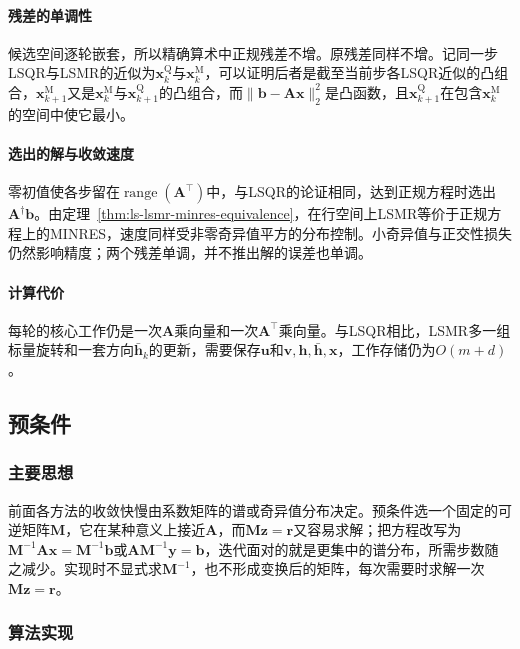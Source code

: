\paragraph{残差的单调性}
候选空间逐轮嵌套，所以精确算术中正规残差不增。原残差同样不增。记同一步LSQR与LSMR的近似为$\bm x_k^{\mathrm Q}$与$\bm x_k^{\mathrm M}$，可以证明后者是截至当前步各LSQR近似的凸组合，$\bm x_{k+1}^{\mathrm M}$又是$\bm x_k^{\mathrm M}$与$\bm x_{k+1}^{\mathrm Q}$的凸组合，而$\lVert\bm b-\bm A\bm x\rVert_2^2$是凸函数，且$\bm x_{k+1}^{\mathrm Q}$在包含$\bm x_k^{\mathrm M}$的空间中使它最小。

\paragraph{选出的解与收敛速度}
零初值使各步留在$\operatorname{range}(\bm A^\top)$中，与LSQR的论证相同，达到正规方程时选出$\bm A^\dagger\bm b$。由定理~\ref{thm:ls-lsmr-minres-equivalence}，在行空间上LSMR等价于正规方程上的MINRES，速度同样受非零奇异值平方的分布控制。小奇异值与正交性损失仍然影响精度；两个残差单调，并不推出解的误差也单调。

\paragraph{计算代价}
每轮的核心工作仍是一次$\bm A$乘向量和一次$\bm A^\top$乘向量。与LSQR相比，LSMR多一组标量旋转和一套方向$\bar{\bm h}_k$的更新，需要保存$\bm u$和$\bm v,\bm h,\bar{\bm h},\bm x$，工作存储仍为$O(m+d)$。

\subsection{预条件}
\label{sec:ls-preconditioning}

\subsubsection{主要思想}

前面各方法的收敛快慢由系数矩阵的谱或奇异值分布决定。预条件选一个固定的可逆矩阵$\bm M$，它在某种意义上接近$\bm A$，而$\bm M\bm z=\bm r$又容易求解；把方程改写为$\bm M^{-1}\bm A\bm x=\bm M^{-1}\bm b$或$\bm A\bm M^{-1}\bm y=\bm b$，迭代面对的就是更集中的谱分布，所需步数随之减少。实现时不显式求$\bm M^{-1}$，也不形成变换后的矩阵，每次需要时求解一次$\bm M\bm z=\bm r$。

\subsubsection{算法实现}

